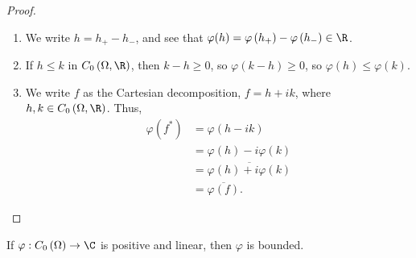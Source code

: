 \documentclass[10pt]{mypackage}
\begin{document}
\begin{proof}\hfill
  \begin{enumerate}[(1)]
    \item We write $h = h_{+} - h_{-}$, and see that $\varphi(h) = \varphi\left(h_{+}\right) - \varphi\left(h_{-}\right) \in \R$.
    \item If $h \leq k$ in $C_0\left(\Omega,\R\right)$, then $k-h\geq 0$, so $\varphi\left(k-h\right) \geq 0$, so $\varphi\left(h\right)\leq \varphi\left(k\right)$.
      \item We write $f$ as the Cartesian decomposition, $f = h + ik$, where $h,k\in C_0\left(\Omega,\R\right)$. Thus,
        \begin{align*}
          \varphi\left(f^{\ast}\right) &= \varphi\left(h-ik\right)\\
                                       &= \varphi\left(h\right) - i\varphi\left(k\right)\\
                                       &= \overline{\varphi(h) + i\varphi\left(k\right)}\\
                                       &= \overline{\varphi(f)}.
        \end{align*}
  \end{enumerate}
\end{proof}
\begin{proposition}
  If $\varphi: C_0\left(\Omega\right)\rightarrow \C$ is positive and linear, then $\varphi$ is bounded.
\end{proposition}
\end{document}
